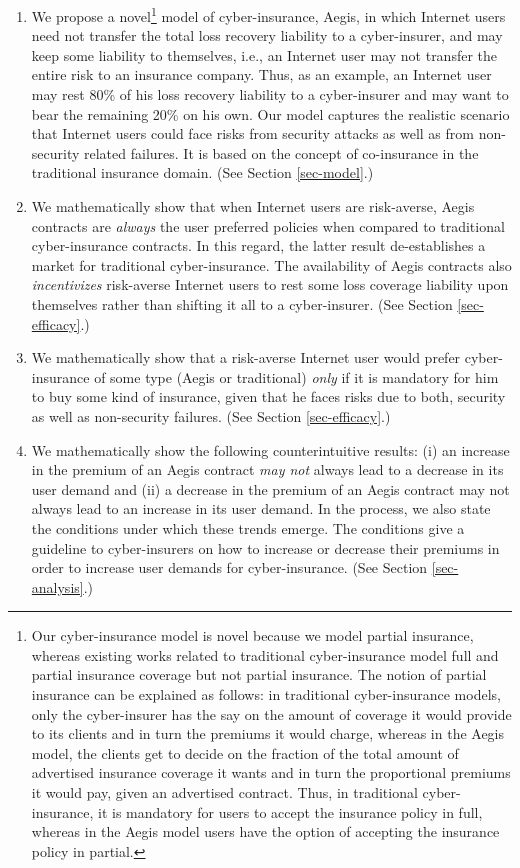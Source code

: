 \documentclass[letterpaper,12pt, onecolumn, nodraft]{IEEEtran}
\begin{document}
\begin{enumerate}
\item We propose a novel\footnote{Our cyber-insurance model is novel because we model partial insurance, whereas existing works related to traditional cyber-insurance model full and partial insurance coverage but not partial insurance. The notion of partial insurance can be explained as follows: in traditional cyber-insurance models, only the cyber-insurer has the say on the amount of coverage it would provide to its clients and in turn the premiums it would charge, whereas in the Aegis model, the clients get to decide on the fraction of the total amount of advertised insurance coverage it wants and in turn the proportional premiums it would pay, given an advertised contract. Thus, in traditional cyber-insurance, it is mandatory for users to accept the insurance policy in full, whereas in the Aegis model users have the option of accepting the insurance policy in partial.} model of cyber-insurance, Aegis, in which Internet users need not transfer the total loss recovery liability to a cyber-insurer, and may keep some liability to themselves, i.e., an Internet user may not transfer the entire risk to an insurance company. Thus, as an example, an Internet user may rest 80\% of his loss recovery liability to a cyber-insurer and may want to bear the remaining 20\% on his own. Our model captures the realistic scenario that Internet users could face risks from security attacks as well as from non-security related failures. It is based on the concept of co-insurance in the traditional insurance domain. (See Section \ref{sec-model}.)\\
\item We mathematically show that when Internet users are risk-averse, Aegis contracts are \emph{always} the user preferred policies when compared to traditional cyber-insurance contracts. In this regard, the latter result de-establishes a market for traditional cyber-insurance.
The availability of Aegis contracts also \emph{incentivizes} risk-averse Internet users to rest some loss coverage liability upon themselves rather than shifting it all to a cyber-insurer. (See Section \ref{sec-efficacy}.) \\
\item We mathematically show that a risk-averse Internet user would prefer cyber-insurance of some type (Aegis or traditional) \emph{only} if it is mandatory for him to buy some kind of insurance, given that he faces risks due to both, security as well as non-security failures.  (See Section \ref{sec-efficacy}.) \\ 
\item We mathematically show the following counterintuitive results: (i) an increase in the premium of an Aegis contract \emph{may not} always lead to a decrease in its user demand and (ii) a decrease in the premium of an Aegis contract may not always lead to an increase in its user demand. In the process, we also state the conditions under which these trends emerge. The conditions give a guideline to cyber-insurers on how to increase or decrease their premiums in order to increase user demands for cyber-insurance.  (See Section \ref{sec-analysis}.)


\end{enumerate}
\end{document}
